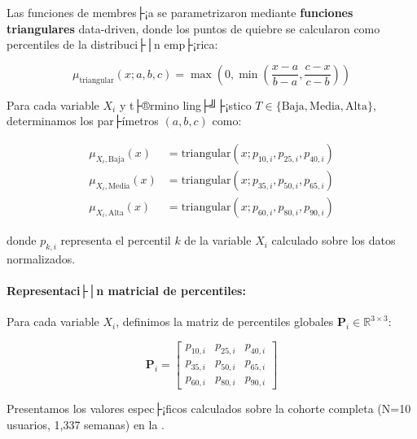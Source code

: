 Las funciones de membres├¡a se parametrizaron mediante \textbf{funciones triangulares} data-driven, donde los puntos de quiebre se calcularon como percentiles de la distribuci├│n emp├¡rica:

\begin{equation}
\mu_{\text{triangular}}(x; a, b, c) = \max\left(0, \min\left(\frac{x - a}{b - a}, \frac{c - x}{c - b}\right)\right)
\label{eq:func_triangular}
\end{equation}

Para cada variable \(X_i\) y t├®rmino ling├╝├¡stico \(T \in \{\text{Baja}, \text{Media}, \text{Alta}\}\), determinamos los par├ímetros \((a, b, c)\) como:

\begin{align}
\mu_{X_i, \text{Baja}}(x) &= \text{triangular}(x; p_{10,i}, p_{25,i}, p_{40,i}) \label{eq:mf_baja} \\
\mu_{X_i, \text{Media}}(x) &= \text{triangular}(x; p_{35,i}, p_{50,i}, p_{65,i}) \label{eq:mf_media} \\
\mu_{X_i, \text{Alta}}(x) &= \text{triangular}(x; p_{60,i}, p_{80,i}, p_{90,i}) \label{eq:mf_alta}
\end{align}

donde \(p_{k,i}\) representa el percentil \(k\) de la variable \(X_i\) calculado sobre los datos normalizados.

\paragraph{Representaci├│n matricial de percentiles:}

Para cada variable \(X_i\), definimos la matriz de percentiles globales \(\mathbf{P}_i \in \mathbb{R}^{3 \times 3}\):

\begin{equation}
\mathbf{P}_i = \begin{bmatrix}
p_{10,i} & p_{25,i} & p_{40,i} \\
p_{35,i} & p_{50,i} & p_{65,i} \\
p_{60,i} & p_{80,i} & p_{90,i}
\end{bmatrix}
\label{eq:matriz_percentiles}
\end{equation}

Presentamos los valores espec├¡ficos calculados sobre la cohorte completa (N=10 usuarios, 1,337 semanas) en la .

